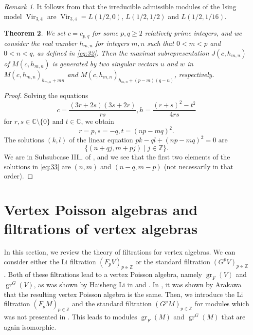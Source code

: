\documentclass[a4paper, 12pt, reqno]{amsart}
\newtheorem{theorem}{Theorem}[section]
\theoremstyle{remark}
\newtheorem{remark}[theorem]{Remark}
\numberwithin{equation}{subsection}
\DeclareMathOperator{\Vir}{Vir}
\DeclareMathOperator{\gr}{gr}
\begin{document}
\begin{remark}
  \label{rmk:35}
  It follows from  that the irreducible admissible modules of the Ising model $\Vir_{3, 4}$ are $\Vir_{3, 4} = L(1/2, 0)$, $L(1/2, 1/2)$ and $L(1/2, 1/16)$.
\end{remark}

\begin{theorem}
  \label{thr:44}
  We set $c = c_{p, q}$ for some $p, q \ge 2$ relatively prime integers, and we consider the real number $h_{m, n}$ for integers $m, n$ such that $0 < m < p$ and $0 < n < q$, as defined in \eqref{eq:32}.
  Then the maximal subrepresentation $J(c, h_{m, n})$ of $M(c, h_{m, n})$ is generated by two singular vectors $u$ and $w$ in $M(c, h_{m, n})_{h_{m, n} + mn}$ and $M(c, h_{m, n})_{h_{m, n} + (p - m)(q - n)}$, respectively.
\end{theorem}

\begin{proof}
  Solving the equations
  \begin{equation*}
    c = \frac{(3r + 2s)(3s + 2r)}{rs}, h = \frac{(r + s)^2 - t^2}{4rs}
  \end{equation*}
  for $r, s \in \mathbb{C} \setminus \{0\}$ and $t \in \mathbb{C}$, we obtain
  \begin{equation*}
    r = p, s = -q, t = (np - mq)^2.
  \end{equation*}
  The solutions $(k, l)$ of the linear equation $pk - ql + (np - mq)^2 = 0$ are
  \begin{equation}
    \label{eq:33}
    \{(n + qj, m + pj) \mid j \in \mathbb{Z}\}.
  \end{equation}
  We are in Subsubcase III$_-$ of , and we see that the first two elements of the solutions in \eqref{eq:33} are $(n, m)$ and $(n - q, m - p)$ (not necessarily in that order).
\end{proof}

\section{Vertex Poisson algebras and filtrations of vertex algebras}
\label{sec:vert-poiss-algeb}

In this section, we review the theory of filtrations for vertex algebras.
We can consider either the Li filtration $(F_pV)_{p \in \mathbb{Z}}$ or the standard filtration $(G^pV)_{p \in \mathbb{Z}}$.
Both of these filtrations lead to a vertex Poisson algebra, namely $\gr_F(V)$ and $\gr^G(V)$, as was shown by Haisheng Li in \cite{li_abelianizing_2005} and \cite{li_vertex_2004}.
In \cite{arakawa_remark_2012}, it was shown by Arakawa that the resulting vertex Poisson algebra is the same.
Then, we introduce the Li filtration $(F_pM)_{p \in \mathbb{Z}}$ and the standard filtration $(G^pM)_{p \in \mathbb{Z}}$ for modules which was not presented in \cite{li_vertex_2004}.
This leads to modules $\gr_F(M)$ and $\gr^G(M)$ that are again isomorphic.
\end{document}
